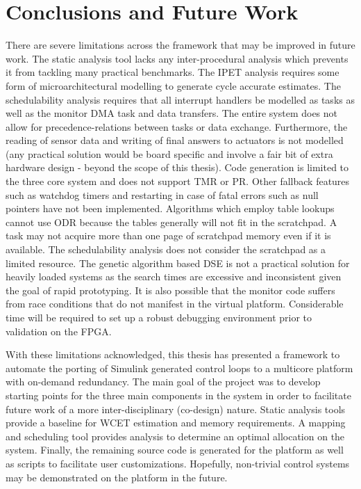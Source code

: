
\chapter{Conclusions and Future Work} 

\label{c:concl} 

	There are severe limitations across the framework that may be improved in future work.
	The static analysis tool lacks any inter-procedural analysis which prevents it from tackling many practical benchmarks.
	The IPET analysis requires some form of microarchitectural modelling to generate cycle accurate estimates.
	The schedulability analysis requires that all interrupt handlers be modelled as tasks as well as the monitor DMA task and data transfers.
	The entire system does not allow for precedence-relations between tasks or data exchange. 
	Furthermore, the reading of sensor data and writing of final answers to actuators is not modelled (any practical solution would be board specific and involve a fair bit of extra hardware design - beyond the scope of this thesis).
	Code generation is limited to the three core system and does not support TMR or PR.
	Other fallback features such as watchdog timers and restarting in case of fatal errors such as null pointers have not been implemented.
	Algorithms which employ table lookups cannot use ODR because the tables generally will not fit in the scratchpad.
	A task may not acquire more than one page of scratchpad memory even if it is available.
	The schedulability analysis does not consider the scratchpad as a limited resource.
	The genetic algorithm based DSE is not a practical solution for heavily loaded systems as the search times are excessive and inconsistent given the goal of rapid prototyping. 
	It is also possible that the monitor code suffers from race conditions that do not manifest in the virtual platform. 
	Considerable time will be required to set up a robust debugging environment prior to validation on the FPGA.
	


	With these limitations acknowledged, this thesis has presented a framework to automate the porting of Simulink generated control loops to a multicore platform with on-demand redundancy.
	The main goal of the project was to develop starting points for the three main components in the system in order to facilitate future work of a more inter-disciplinary (co-design) nature. 
	Static analysis tools provide a baseline for WCET estimation and memory requirements. 
	A mapping and scheduling tool provides analysis to determine an optimal allocation on the system.
	Finally, the remaining source code is generated for the platform as well as scripts to facilitate user customizations.
	Hopefully, non-trivial control systems may be demonstrated on the platform in the future.
		